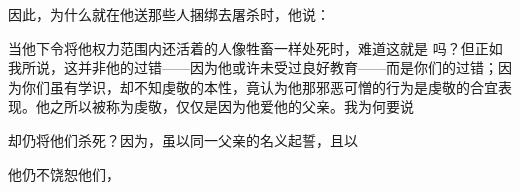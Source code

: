 \par

因此，为什么就在他送那些人捆绑去屠杀时，他说：\par

\par

当他下令将他权力范围内还活着的人像牲畜一样处死时，难道这就是  吗？但正如我所说，这并非他的过错——因为他或许未受过良好教育——而是你们的过错；因为你们虽有学识，却不知虔敬的本性，竟认为他那邪恶可憎的行为是虔敬的合宜表现。他之所以被称为虔敬，仅仅是因为他爱他的父亲。我为何要说\par

\par

却仍将他们杀死？因为，虽以同一父亲的名义起誓，且以\par

\par

他仍不饶恕他们，\par

\par

